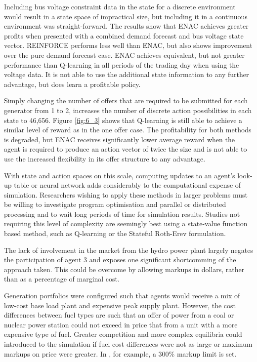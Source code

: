 Including bus voltage constraint data in the state for a discrete environment
would result in a state space of impractical size, but including it in a
continuous environment was straight-forward.  The results show that ENAC
achieves greater profits when presented with a combined demand forecast and bus
voltage state vector.  REINFORCE performs less well than ENAC, but also shows
improvement over the pure demand forecast case.  ENAC achieves equivalent, but
not greater performance than Q-learning in all periods of the trading day when
using the voltage data.  It is not able to use the additional state information
to any further advantage, but does learn a profitable policy.

Simply changing the number of offers that are required to be submitted for each
generator from 1 to 2, increases the number of discrete action possibilities in
each state to 46,656.  Figure \ref{fig:6_3} shows that Q-learning is still able
to achieve a similar level of reward as in the one offer case.  The
profitability for both methods is degraded, but ENAC receives significantly
lower average reward when the agent is required to produce an action
vector of twice the size and is not able to use the increased flexibility in
its offer structure to any advantage.

With state and action spaces on this scale, computing updates to an agent's
look-up table or neural network adds considerably to the computational
expense of simulation.  Researchers wishing to apply these methods in
larger problems must be willing to investigate program optimisation and
parallel or distributed processing and to wait long periods of time for
simulation results.  Studies not requiring this level of complexity are
seemingly best using a state-value function based method, such as Q-learning or
the Stateful Roth-Erev formulation.

The lack of involvement in the market from the hydro power plant largely negates
the participation of agent 3 and exposes one significant shortcomming of the
approach taken. This could be overcome by allowing markups in dollars, rather
than as a percentage of marginal cost.

Generation portfolios were configured
such that agents would receive a mix of low-cost base load plant and expensive peak supply
plant.  However, the cost differences between fuel types are such that an offer
of power from a coal or nuclear power station could not exceed in price that
from a unit with a more expensive type of fuel.  Greater competition and more
complex equilibria could introduced to the simulation if fuel cost differences
were not as large or maximum markups on price were greater.  In
, for example, a 300\% markup limit is set.

